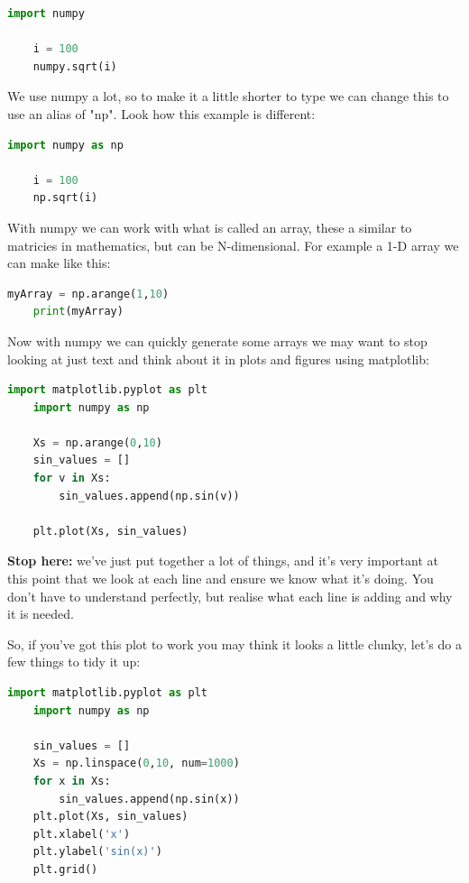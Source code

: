 \documentclass[12pt]{article}
\begin{document}
\begin{lstlisting}[language=Python]
    import numpy 

    i = 100 
    numpy.sqrt(i)
\end{lstlisting}

We use numpy a lot, so to make it a little shorter to type we can change this to use an alias of "np". Look how this example is different:

\begin{lstlisting}[language=Python]
    import numpy as np 

    i = 100 
    np.sqrt(i)
\end{lstlisting}

With numpy we can work with what is called an array, these a similar to matricies in mathematics, but can be N-dimensional. For example a 1-D array we can make like this:

\begin{lstlisting}[language=Python]
    myArray = np.arange(1,10)
    print(myArray)
\end{lstlisting}

Now with numpy we can quickly generate some arrays we may want to stop looking at just text and think about it in plots and figures using matplotlib:

\begin{lstlisting}[language=Python]
    import matplotlib.pyplot as plt 
    import numpy as np 

    Xs = np.arange(0,10)
    sin_values = []
    for v in Xs:
        sin_values.append(np.sin(v))

    plt.plot(Xs, sin_values)

\end{lstlisting}

\textbf{Stop here:} we've just put together a lot of things, and it's very important at this point that we look at each line and ensure we know what it's doing. You don't have to understand perfectly, but realise what each line is adding and why it is needed.

So, if you've got this plot to work you may think it looks a little clunky, let's do a few things to tidy it up:

\begin{lstlisting}[language=Python]
    import matplotlib.pyplot as plt 
    import numpy as np 

    sin_values = []
    Xs = np.linspace(0,10, num=1000)
    for x in Xs:
        sin_values.append(np.sin(x))
    plt.plot(Xs, sin_values)
    plt.xlabel('x')
    plt.ylabel('sin(x)')
    plt.grid()

\end{lstlisting}
\end{document}
